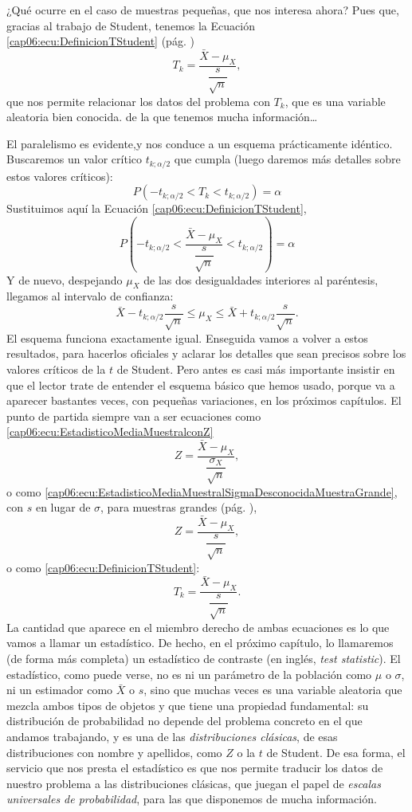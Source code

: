 ¿Qué ocurre en el caso de muestras pequeñas, que nos interesa ahora? Pues que,
gracias al trabajo de Student, tenemos la Ecuación \ref{cap06:ecu:DefinicionTStudent} (pág.
\pageref{cap06:ecu:DefinicionTStudent})
\[T_k=\dfrac{\bar X-\mu_X}{\dfrac{s}{\sqrt{n}}},\]
que nos permite relacionar los datos del problema con $T_k$, que es una
variable aleatoria bien conocida. de la que tenemos mucha información\ldots

El paralelismo es evidente,y nos conduce a un esquema prácticamente idéntico.
Buscaremos un valor crítico $t_{k;\alpha/2}$ que cumpla (luego daremos más
detalles sobre estos valores críticos):
    \[P\left(-t_{k;\alpha/2}< T_k <t_{k;\alpha/2}\right)=\alpha\]
Sustituimos aquí la Ecuación \ref{cap06:ecu:DefinicionTStudent},
    \[P\left(-t_{k;\alpha/2}< \dfrac{\bar X-\mu_X}{\dfrac{s}{\sqrt{n}}} <t_{k;\alpha/2}\right)=\alpha\]
Y de nuevo, despejando $\mu_X$ de las dos desigualdades interiores al
paréntesis, llegamos al intervalo de confianza:
    \[\bar X-t_{k;\alpha/2}\dfrac{s}{\sqrt{n}}\leq \mu_X \leq \bar X+t_{k;\alpha/2}\dfrac{s}{\sqrt{n}}.\]
El esquema funciona exactamente igual. Enseguida vamos a volver a estos
resultados, para hacerlos oficiales y aclarar los detalles que sean precisos
sobre los valores críticos de la $t$ de Student. Pero antes es casi más
importante insistir en que el lector trate de entender el esquema básico que
hemos usado, porque va a aparecer bastantes veces, con pequeñas variaciones, en
los próximos capítulos. El punto de partida siempre van a ser ecuaciones como
\label{cap06:lugar:ListaEstadisticosMedia}
\ref{cap06:ecu:EstadisticoMediaMuestralconZ}
\[Z=\dfrac{\bar X-\mu_X}{\dfrac{\sigma_X}{\sqrt{n}}},\]
o como \ref{cap06:ecu:EstadisticoMediaMuestralSigmaDesconocidaMuestraGrande},
con $s$ en lugar de $\sigma$, para muestras grandes (pág.
\pageref{cap06:ecu:EstadisticoMediaMuestralSigmaDesconocidaMuestraGrande}),
\[Z=\dfrac{\bar X-\mu_X}{\dfrac{s}{\sqrt{n}}},\]
o  como \ref{cap06:ecu:DefinicionTStudent}:
\[T_k=\dfrac{\bar X-\mu_X}{\dfrac{s}{\sqrt{n}}}.\]
La cantidad que aparece en el miembro derecho de ambas ecuaciones es lo que
vamos a llamar un {\sf estadístico}. De hecho, en el próximo capítulo, lo
llamaremos (de forma más completa) un {\sf estadístico de
contraste} (en inglés, {\em test
statistic}). El estadístico, como puede verse, no es ni un
parámetro de la población como $\mu$ o $\sigma$, ni un estimador como $\bar X$
o $s$, sino que muchas veces es una variable aleatoria que mezcla ambos tipos de objetos y que tiene
una propiedad fundamental: su distribución de probabilidad no depende del
problema concreto en el que andamos trabajando, y es una de las {\em
distribuciones clásicas}, de esas distribuciones con nombre y apellidos, como
$Z$ o la $t$ de Student. De esa forma, el servicio que nos presta el
estadístico es que nos permite traducir los datos de nuestro problema a las
distribuciones clásicas, que juegan el papel de {\em escalas universales de
probabilidad}, para las que disponemos de mucha información.

